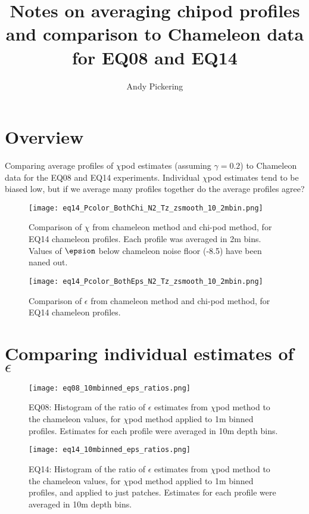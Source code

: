 \documentclass[11pt]{article}
\title{Notes on averaging chipod profiles and comparison to Chameleon data for EQ08 and EQ14}
\author{Andy Pickering}
\begin{document}
\maketitle

\tableofcontents
\newpage

\section{Overview}

Comparing average profiles of $\chi$pod estimates (assuming $\gamma=0.2$) to Chameleon data for the EQ08 and EQ14 experiments. Individual $\chi$pod estimates tend to be biased low, but if we average many profiles together do the average profiles agree?


\begin{figure}[htbp]
\texttt{[image: eq14\_Pcolor\_BothChi\_N2\_Tz\_zsmooth\_10\_2mbin.png]}
\caption{Comparison of $\chi$ from chameleon method and chi-pod method, for EQ14 chameleon profiles. Each profile was averaged in 2m bins.  Values of $\epsion$ below chameleon noise floor (-8.5) have been naned out.}
\label{}
\end{figure}

\begin{figure}[htbp]
\texttt{[image: eq14\_Pcolor\_BothEps\_N2\_Tz\_zsmooth\_10\_2mbin.png]}
\caption{Comparison of $\epsilon$ from chameleon method and chi-pod method, for EQ14 chameleon profiles.}
\label{}
\end{figure}



\clearpage
\section{Comparing individual estimates of $\epsilon$}


\begin{figure}[htbp]
\texttt{[image: eq08\_10mbinned\_eps\_ratios.png]}
\caption{EQ08: Histogram of the ratio of $\epsilon$ estimates from $\chi$pod method to the chameleon values, for $\chi$pod method applied to 1m binned profiles. Estimates for each profile were averaged in 10m depth bins.}
\label{epsrathist_eq08}
\end{figure}


\begin{figure}[htbp]
\texttt{[image: eq14\_10mbinned\_eps\_ratios.png]}
\caption{EQ14: Histogram of the ratio of $\epsilon$ estimates from $\chi$pod method to the chameleon values, for $\chi$pod method applied to 1m binned profiles, and applied to just patches. Estimates for each profile were averaged in 10m depth bins.}
\label{epsrathist_eq14}
\end{figure}
\end{document}
